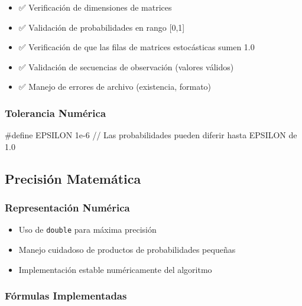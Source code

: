 \documentclass[
]{article}
\newenvironment{Shaded}{\begin{snugshade}}{\end{snugshade}}
\newcommand{\CommentTok}[1]{\textcolor[rgb]{0.37,0.37,0.37}{#1}}
\newcommand{\FloatTok}[1]{\textcolor[rgb]{0.68,0.00,0.00}{#1}}
\newcommand{\PreprocessorTok}[1]{\textcolor[rgb]{0.68,0.00,0.00}{#1}}
\providecommand{\tightlist}{%
  \setlength{\itemsep}{0pt}\setlength{\parskip}{0pt}}
\begin{document}
\begin{itemize}
\tightlist
\item
  ✅ Verificación de dimensiones de matrices
\item
  ✅ Validación de probabilidades en rango {[}0,1{]}
\item
  ✅ Verificación de que las filas de matrices estocásticas sumen 1.0
\item
  ✅ Validación de secuencias de observación (valores válidos)
\item
  ✅ Manejo de errores de archivo (existencia, formato)
\end{itemize}

\subsubsection{Tolerancia Numérica}\label{tolerancia-numuxe9rica}

\begin{Shaded}
\begin{Highlighting}[]
\PreprocessorTok{\#define EPSILON }\FloatTok{1e{-}6}
\CommentTok{// Las probabilidades pueden diferir hasta EPSILON de 1.0}
\end{Highlighting}
\end{Shaded}

\subsection{Precisión Matemática}\label{precisiuxf3n-matemuxe1tica}

\subsubsection{Representación
Numérica}\label{representaciuxf3n-numuxe9rica}

\begin{itemize}
\tightlist
\item
  Uso de \texttt{double} para máxima precisión
\item
  Manejo cuidadoso de productos de probabilidades pequeñas
\item
  Implementación estable numéricamente del algoritmo
\end{itemize}

\subsubsection{Fórmulas Implementadas}\label{fuxf3rmulas-implementadas}
\end{document}
